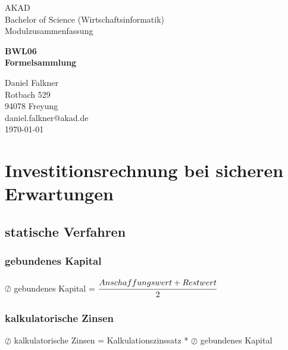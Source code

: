 \documentclass[a4paper,12pt]{scrartcl}
\begin{document}
\begin{titlepage}
\begin{small}
\vfill {AKAD\\ 
Bachelor of Science (Wirtschaftsinformatik) \\ 
Modulzusammenfassung}
\end{small}


\begin{center}
\begin{Large}
\vfill {\textsf{\textbf{
BWL06 \\
\vspace*{1cm} 
Formelsammlung
}}}
\end{Large}
\end{center}

\begin{small}
\vfill Daniel Falkner \\ Rotbach 529 \\  94078 Freyung \\  daniel.falkner@akad.de \\ 
\today
\end{small}

\end{titlepage}


\tableofcontents

\clearpage

\onehalfspacing

\pagestyle{plain}



\section{Investitionsrechnung bei sicheren Erwartungen}
\subsection{statische Verfahren}
\subsubsection{gebundenes Kapital}
$\oslash$ gebundenes Kapital = $\cfrac{Anschaffungswert + Restwert}{2}$
\subsubsection{kalkulatorische Zinsen}
$\oslash$ kalkulatorische Zinsen = Kalkulationszinssatz * $\oslash$ gebundenes Kapital
\end{document}

